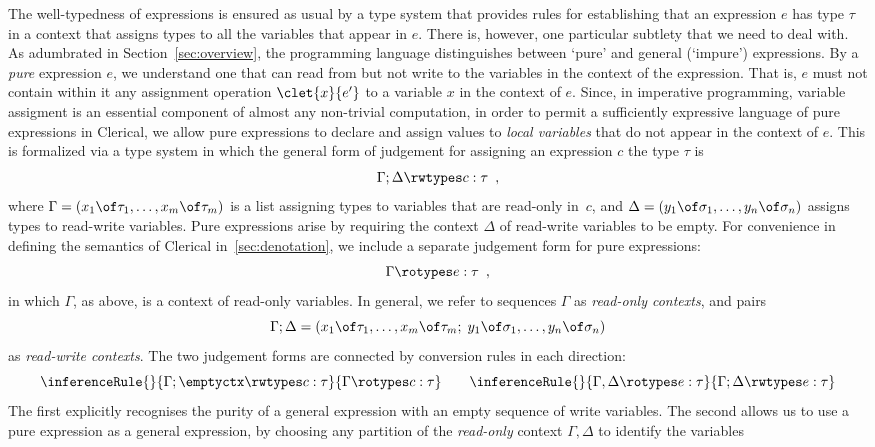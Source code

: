 The well-typedness of expressions is ensured as usual by a type system that provides rules for 
establishing that an expression $e$ has type $\tau$ in a context that assigns types to  all the variables that appear in $e$.
There is, however, one particular subtlety that we need to deal with. As adumbrated in Section~\ref{sec:overview}, the programming language distinguishes between `pure' and general (`impure') expressions. By a \emph{pure} expression $e$, we understand one that can read from but not write to the variables in the context of the expression.  That is, $e$ must 
not contain within it any assignment operation $\clet{x}{e'}$ to a variable $x$ in the context of $e$. 
Since, in imperative programming, variable assigment is an essential component of almost any non-trivial computation, in order to permit a sufficiently expressive language of pure expressions in Clerical, we allow pure expressions to declare and assign values to 
\emph{local variables} that do not appear in the context of $e$. This is formalized via  a type system in which the general form of judgement for assigning an expression $c$ the type $\tau$ is 
\[
  \Gamma; \Delta \rwtypes c : \tau  \enspace , 
\]
where $\Gamma = (x_1 \of \tau_1, \ldots, x_m \of \tau_m)$ is a list assigning types to variables that are read-only in~$c$,
and $\Delta = (y_1 \of \sigma_1, \ldots, y_n \of \sigma_n)$ assigns types to read-write variables. 
Pure expressions arise by requiring the context $\Delta$ of read-write variables to be empty. For convenience in defining the semantics of 
Clerical in~\cref{sec:denotation},
we include a separate judgement form for pure expressions:
\[
  \Gamma \rotypes e : \tau  \enspace , 
\]
in which $\Gamma$, as above,   is a context of read-only variables. In general, we refer to sequences $\Gamma$ as 
\emph{read-only contexts}, and pairs
%
\begin{equation*}
 \Gamma ; \Delta =
 (x_1 \of \tau_1, \ldots, x_m \of \tau_m ;\; y_1 \of \sigma_1, \ldots, y_n \of \sigma_n)
\end{equation*}
%
as \emph{read-write contexts}. The two judgement forms are connected by conversion  rules in each direction:
\[
   \inferenceRule{}{
      \Gamma ; \emptyctx \rwtypes c : \tau
    }{
      \Gamma \rotypes c : \tau
    }
\qquad
    \inferenceRule{}{
      \Gamma, \Delta \rotypes e : \tau
    }{
      \Gamma ; \Delta \rwtypes e : \tau
    }
\]
The first explicitly recognises the purity of a general expression with an empty sequence of write variables. The second allows us to use a pure expression
as a general expression, by choosing any partition of the \emph{read-only} context $\Gamma,\Delta$ to identify the variables

